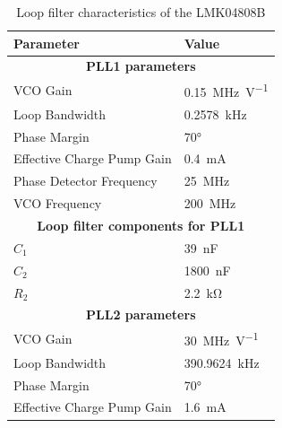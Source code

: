 \begin{table}[H]
	\caption[LMK04808B loop filter characteristics]{Loop filter characteristics of the LMK04808B}
	\label{tab:lmk04808B_filter}
	\centering
	\begin{tabularx}{\textwidth}{Xl}
		\toprule
		\textbf{Parameter}                                                        & \textbf{Value}           \\ \midrule
		                            \multicolumn{2}{c}{\textbf{PLL1 parameters}}                             \\
		VCO Gain                                                                  & \SI{0.15}{\MHz\per\volt} \\
		Loop Bandwidth                                                            & \SI{0.2578}{\kHz}        \\
		Phase Margin                                                              & \ang{70}                 \\
		Effective Charge Pump Gain                                                & \SI{0.4}{\milli\ampere}  \\
		Phase Detector Frequency                                                  & \SI{25}{\MHz}            \\
		VCO Frequency                                                             & \SI{200}{\MHz}           \\
		                    \multicolumn{2}{c}{\textbf{Loop filter components for PLL1}}                     \\
		$C_{1}$                                                                   & \SI{39}{\nano\farad}     \\
		$C_{2}$                                                                   & \SI{1800}{\nano\farad}   \\
		$R_{2}$                                                                   & \SI{2.2}{\kilo\ohm}      \\
		[0.3cm]
	    \multicolumn{2}{c}{\textbf{PLL2 parameters}}                   \\
		VCO Gain                                                                  & \SI{30}{\MHz\per\volt}   \\
		Loop Bandwidth                                                            & \SI{390.9624}{\kHz}      \\
		Phase Margin                                                              & \ang{70}                 \\
		Effective Charge Pump Gain                                                & \SI{1.6}{\milli\ampere}  \\

\end{tabularx}
\end{table}
